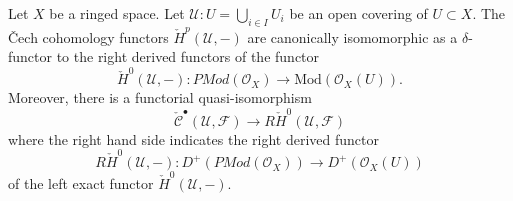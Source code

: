 \begin{lemma}
\label{lemma-cech-cohomology-derived-presheaves}
Let $X$ be a ringed space.
Let $\mathcal{U} : U = \bigcup_{i \in I} U_i$
be an open covering of $U \subset X$.
The {\v C}ech cohomology functors $\check{H}^p(\mathcal{U}, -)$
are canonically isomomorphic as a $\delta$-functor to
the right derived functors of the functor
$$
\check{H}^0(\mathcal{U}, -) :
\textit{PMod}(\mathcal{O}_X)
\longrightarrow
\text{Mod}(\mathcal{O}_X(U)).
$$
Moreover, there is a functorial quasi-isomorphism
$$
\check{\mathcal{C}}^\bullet(\mathcal{U}, \mathcal{F})
\longrightarrow
R\check{H}^0(\mathcal{U}, \mathcal{F})
$$
where the right hand side indicates the right derived functor
$$
R\check{H}^0(\mathcal{U}, -) :
D^{+}(\textit{PMod}(\mathcal{O}_X))
\longrightarrow
D^{+}(\mathcal{O}_X(U))
$$
of the left exact functor $\check{H}^0(\mathcal{U}, -)$.
\end{lemma}

